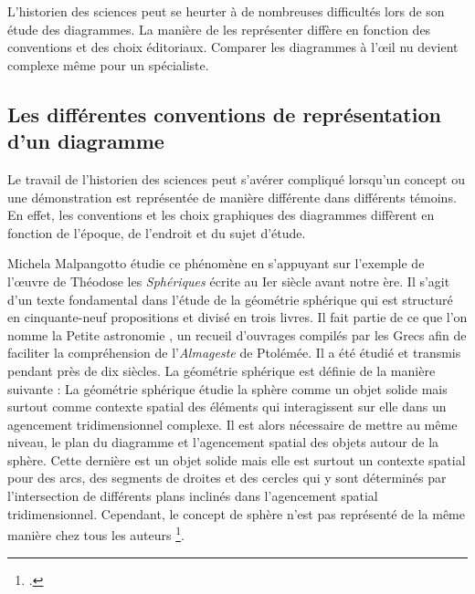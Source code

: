 L'historien des sciences  peut se heurter à de nombreuses difficultés lors de son étude des diagrammes. La manière de les représenter diffère en fonction des conventions et des choix éditoriaux. Comparer les diagrammes à l'œil nu devient complexe même pour un spécialiste. 

\subsection{Les différentes conventions de représentation d'un diagramme}

Le travail de l'historien des sciences peut s'avérer compliqué lorsqu'un concept ou une démonstration est représentée de manière différente dans différents témoins.  En effet, les conventions et les choix graphiques des diagrammes diffèrent en fonction de l'époque, de l'endroit et du sujet d'étude.

Michela Malpangotto étudie ce phénomène en s'appuyant sur l'exemple de l'œuvre de Théodose les \textit{Sphériques} écrite au Ier siècle avant notre ère. Il s'agit d'un texte fondamental dans l'étude de la géométrie sphérique qui est structuré en cinquante-neuf propositions et divisé en trois livres. Il fait partie de ce que l'on nomme la \og Petite astronomie \fg, un recueil d'ouvrages compilés par les Grecs afin de faciliter la compréhension de l'\textit{Almageste} de Ptolémée. Il a été étudié et transmis pendant près de dix siècles. La géométrie sphérique est définie de la manière suivante : \og La géométrie sphérique étudie la sphère comme un objet solide mais surtout comme contexte spatial des éléments qui interagissent sur elle dans un agencement tridimensionnel complexe. \fg Il est alors nécessaire de mettre au même niveau, le plan du diagramme et l'agencement spatial des objets autour de la sphère. Cette dernière est un objet solide mais elle est surtout un contexte spatial pour des arcs, des segments de droites et des cercles qui y sont déterminés par l'intersection de différents plans inclinés dans l'agencement spatial tridimensionnel. Cependant, le concept de sphère n'est pas représenté de la même manière chez tous les auteurs \footcite{malpangottoGraphicalChoicesGeometrical2010}. 

